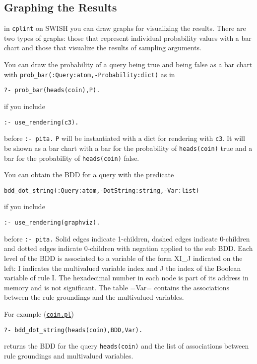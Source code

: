 \subsection{Graphing the Results}
\label{graphing}

in \texttt{cplint} on SWISH you can draw graphs
for visualizing the results. There are two types 
of graphs: those that represent individual probability values with a bar chart and those that 
visualize the results of sampling arguments.

You can draw the probability of a query being true and 
being false as a bar chart with \verb|prob_bar(:Query:atom,-Probability:dict)| as in
\begin{verbatim}
?- prob_bar(heads(coin),P).
\end{verbatim}
if you include
\begin{verbatim}
:- use_rendering(c3).
\end{verbatim}
before \verb|:- pita.| \verb|P| will be instantiated with a
dict for rendering with \verb|c3|. It will be shown as a bar chart with
a bar for the probability of \verb|heads(coin)| true and a bar for the probability of \verb|heads(coin)| false.

You can obtain the BDD for a query with the predicate
\begin{verbatim}
bdd_dot_string(:Query:atom,-DotString:string,-Var:list)
\end{verbatim}
if you include
\begin{verbatim}
:- use_rendering(graphviz).
\end{verbatim}
before \verb|:- pita.| 
Solid edges indicate 1-children, dashed edges indicate 0-children and dotted
edges indicate 0-children with negation applied to the sub BDD.
Each level of the BDD is associated to a variable of the form XI\_J indicated on the left:
I indicates the  multivalued variable index and J the index of the Boolean variable of rule I.
The hexadecimal number in each node is part of its address in memory and is not significant.
The table =Var= contains the associations between the rule groundings and the
multivalued variables.

For example (\href{http://cplint.lamping.unife.it/example/inference/coin.pl}{\texttt{coin.pl}})
\begin{verbatim}
?- bdd_dot_string(heads(coin),BDD,Var).
\end{verbatim}
returns the BDD for the query \verb|heads(coin)| and the list of associations between rule groundings and
multivalued variables.

